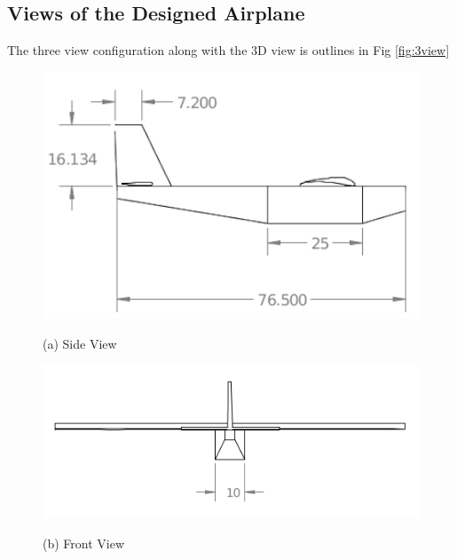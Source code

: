 \subsection{Views of the Designed Airplane}
The three view configuration along with the 3D view is outlines in Fig \ref{fig:3view}
\begin{figure}[H]
\centering
\begin{minipage}{0.5\textwidth}
\begin{centering}
\includegraphics[width=\textwidth]{figures/side.png}
\centerline{\small (a) Side View}
\end{centering}
\end{minipage}
\hspace{2mm}
\begin{minipage}{0.4\textwidth}
\begin{centering}
\includegraphics[width=\textwidth]{figures/front.png}
\centerline{\small (b) Front View}
\end{centering}
\end{minipage}
%
\vspace{0.1in}
\begin{minipage}{0.6\textwidth}
\begin{centering}

\end{centering}
\end{minipage}
\end{figure}
